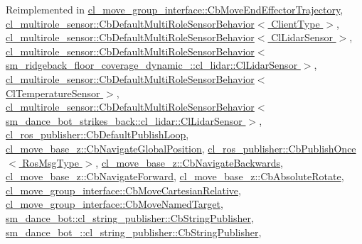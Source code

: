 Reimplemented in \hyperlink{classcl__move__group__interface_1_1CbMoveEndEffectorTrajectory_a4952c092e69bc6e9831568de32888da5}{cl\+\_\+move\+\_\+group\+\_\+interface\+::\+Cb\+Move\+End\+Effector\+Trajectory}, \hyperlink{classcl__multirole__sensor_1_1CbDefaultMultiRoleSensorBehavior_a0f400c7e29d0cb1dda11242a5a922f4c}{cl\+\_\+multirole\+\_\+sensor\+::\+Cb\+Default\+Multi\+Role\+Sensor\+Behavior$<$ Client\+Type $>$}, \hyperlink{classcl__multirole__sensor_1_1CbDefaultMultiRoleSensorBehavior_a0f400c7e29d0cb1dda11242a5a922f4c}{cl\+\_\+multirole\+\_\+sensor\+::\+Cb\+Default\+Multi\+Role\+Sensor\+Behavior$<$ Cl\+Lidar\+Sensor $>$}, \hyperlink{classcl__multirole__sensor_1_1CbDefaultMultiRoleSensorBehavior_a0f400c7e29d0cb1dda11242a5a922f4c}{cl\+\_\+multirole\+\_\+sensor\+::\+Cb\+Default\+Multi\+Role\+Sensor\+Behavior$<$ sm\+\_\+ridgeback\+\_\+floor\+\_\+coverage\+\_\+dynamic\+\_\+::cl\+\_\+lidar\+::\+Cl\+Lidar\+Sensor $>$}, \hyperlink{classcl__multirole__sensor_1_1CbDefaultMultiRoleSensorBehavior_a0f400c7e29d0cb1dda11242a5a922f4c}{cl\+\_\+multirole\+\_\+sensor\+::\+Cb\+Default\+Multi\+Role\+Sensor\+Behavior$<$ Cl\+Temperature\+Sensor $>$}, \hyperlink{classcl__multirole__sensor_1_1CbDefaultMultiRoleSensorBehavior_a0f400c7e29d0cb1dda11242a5a922f4c}{cl\+\_\+multirole\+\_\+sensor\+::\+Cb\+Default\+Multi\+Role\+Sensor\+Behavior$<$ sm\+\_\+dance\+\_\+bot\+\_\+strikes\+\_\+back\+::cl\+\_\+lidar\+::\+Cl\+Lidar\+Sensor $>$}, \hyperlink{classcl__ros__publisher_1_1CbDefaultPublishLoop_a206c6bc09e7c6414304b679ec415c19f}{cl\+\_\+ros\+\_\+publisher\+::\+Cb\+Default\+Publish\+Loop}, \hyperlink{classcl__move__base__z_1_1CbNavigateGlobalPosition_a5c18268af1e7fc236aa155a58345d5d7}{cl\+\_\+move\+\_\+base\+\_\+z\+::\+Cb\+Navigate\+Global\+Position}, \hyperlink{classcl__ros__publisher_1_1CbPublishOnce_ad82cb7d6ac69fe9b91bc955550ab92cb}{cl\+\_\+ros\+\_\+publisher\+::\+Cb\+Publish\+Once$<$ Ros\+Msg\+Type $>$}, \hyperlink{classcl__move__base__z_1_1CbNavigateBackwards_a92858e20e6401051203f5dfa4aef60dc}{cl\+\_\+move\+\_\+base\+\_\+z\+::\+Cb\+Navigate\+Backwards}, \hyperlink{classcl__move__base__z_1_1CbNavigateForward_a2160484562ef5fb1c655fab7f990241e}{cl\+\_\+move\+\_\+base\+\_\+z\+::\+Cb\+Navigate\+Forward}, \hyperlink{classcl__move__base__z_1_1CbAbsoluteRotate_a0e362b8e9f0d7de5aeee183ba4031437}{cl\+\_\+move\+\_\+base\+\_\+z\+::\+Cb\+Absolute\+Rotate}, \hyperlink{classcl__move__group__interface_1_1CbMoveCartesianRelative_a4ec79f1b62ddd8ecabf1f63aabb69013}{cl\+\_\+move\+\_\+group\+\_\+interface\+::\+Cb\+Move\+Cartesian\+Relative}, \hyperlink{classcl__move__group__interface_1_1CbMoveNamedTarget_ae7e89742c903577b71790370714047d8}{cl\+\_\+move\+\_\+group\+\_\+interface\+::\+Cb\+Move\+Named\+Target}, \hyperlink{classsm__dance__bot_1_1cl__string__publisher_1_1CbStringPublisher_ac93cc1eb150140331cb3e560ec8249e2}{sm\+\_\+dance\+\_\+bot\+::cl\+\_\+string\+\_\+publisher\+::\+Cb\+String\+Publisher}, \hyperlink{classsm__dance__bot__2_1_1cl__string__publisher_1_1CbStringPublisher_aee990acdb5ec33f1d22efafbe32216f2}{sm\+\_\+dance\+\_\+bot\+\_\+::cl\+\_\+string\+\_\+publisher\+::\+Cb\+String\+Publisher}, 